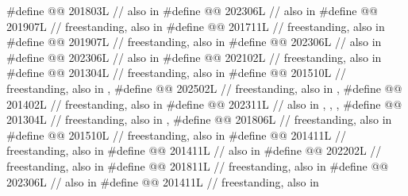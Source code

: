 \begin{codeblock}
#define @@                           201803L // also in 
#define @@                     202306L // also in 
#define @@              201907L // freestanding, also in 
#define @@                        201711L // freestanding, also in 
#define @@                          201907L // freestanding, also in 
#define @@                          202306L // also in 
#define @@                         202306L // also in 
#define @@                     202102L // freestanding, also in 
#define @@      201304L // freestanding, also in 
#define @@             201510L
  // freestanding, also in , 
#define @@             202502L
  // freestanding, also in , 
#define @@                   201402L // freestanding, also in 
#define @@                        202311L
  // also in , , , 
#define @@                    201304L // freestanding, also in , 
#define @@                     201806L // freestanding, also in 
#define @@     201510L // freestanding, also in 
#define @@               201411L // freestanding, also in 
#define @@         201411L // also in 
#define @@                       202202L // freestanding, also in 
#define @@                        201811L // freestanding, also in 
#define @@                           202306L // also in 
#define @@                            201411L // freestanding, also in 
\end{codeblock}

